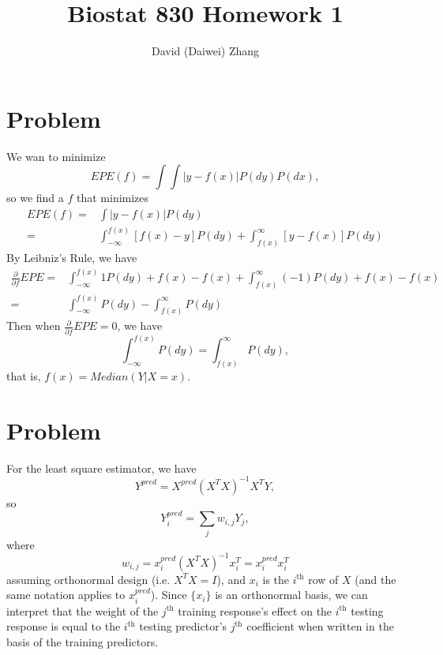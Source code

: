 \documentclass{article}
\title{Biostat 830 Homework 1}
\author{David (Daiwei) Zhang}
\begin{document}
\maketitle
\section{Problem}
We wan to minimize
$$
EPE(f) = \int \int |y - f(x)| P(dy) P(dx),
$$
so we find a $f$ that minimizes
\begin{align*}
  EPE(f) = & \int |y - f(x)| P(dy) \\
  = & \int_{-\infty}^{f(x)} [f(x) - y] P(dy) + \int_{f(x)}^{\infty} [y - f(x)] P(dy)
\end{align*}
By Leibniz's Rule, we have
\begin{align*}
  \frac{\partial}{\partial f} EPE
  = & \int_{-\infty}^{f(x)} 1 P(dy) + f(x) - f(x) 
      + \int_{f(x)}^{\infty} (-1) P(dy) + f(x) - f(x) \\
  = & \int_{-\infty}^{f(x)} P(dy) - \int_{f(x)}^{\infty} P(dy) 
\end{align*}
Then when $\frac{\partial}{\partial f} EPE = 0$, we have 
\[
  \int_{-\infty}^{f(x)} P(dy) = \int_{f(x)}^{\infty} P(dy),
\]
that is, $f(x) = Median(Y | X = x)$.

\section{Problem}

For the least square estimator, we have
\[
  Y^{pred} = X^{pred} (X^T X)^{-1} X^T Y,
\]
so
\[
  Y^{pred}_i = \sum_j w_{i,j} Y_j,
\]
where
\[
  w_{i,j} = x^{pred}_i (X^TX)^{-1} x_i^T = x^{pred}_i x_i^T
\] 
assuming orthonormal design (i.e. $X^TX = I$),
and $x_i$ is the $i^\text{th}$ row of $X$
(and the same notation applies to $x^{pred}_i$).
Since $\{x_i\}$ is an orthonormal basis, we can interpret that the weight of the
$j^\text{th}$ training response's effect on the $i^\text{th}$ testing response
is equal to the $i^\text{th}$ testing predictor's $j^\text{th}$ coefficient when written
in the basis of the training predictors.


 
\end{document}

